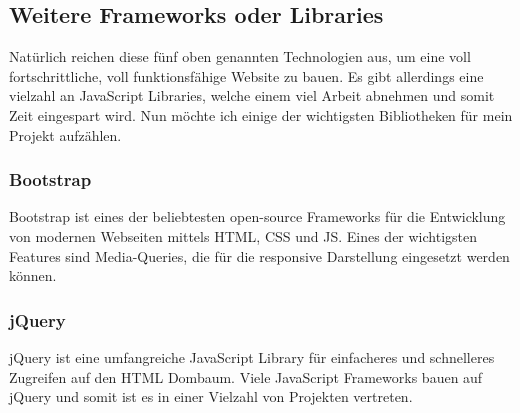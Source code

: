     \subsection{Weitere Frameworks oder Libraries}
    Natürlich reichen diese fünf oben genannten Technologien aus, um eine voll fortschrittliche, voll
    funktionsfähige Website zu bauen. Es gibt allerdings eine vielzahl an JavaScript Libraries, welche
    einem viel Arbeit abnehmen und somit Zeit eingespart wird. Nun möchte ich einige der wichtigsten
    Bibliotheken für mein Projekt aufzählen.

    \subsubsection{Bootstrap}
    Bootstrap ist eines der beliebtesten open-source Frameworks für die Entwicklung von modernen 
    Webseiten mittels HTML, CSS und JS. Eines der wichtigsten Features sind Media-Queries, die für
    die responsive Darstellung eingesetzt werden können.

    \subsubsection{jQuery}
    jQuery ist eine umfangreiche JavaScript Library für einfacheres und schnelleres Zugreifen auf den
    HTML Dombaum. Viele JavaScript Frameworks bauen auf jQuery und somit ist es in einer Vielzahl
    von Projekten vertreten.